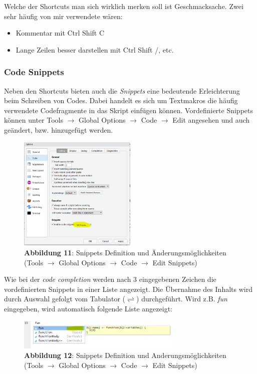 \documentclass[]{article}
\providecommand{\tightlist}{%
  \setlength{\itemsep}{0pt}\setlength{\parskip}{0pt}}
\begin{document}
Welche der Shortcuts man sich wirklich merken soll ist Geschmacksache.
Zwei sehr häufig von mir verwendete wären:

\begin{itemize}
\tightlist
\item
  Kommentar mit Ctrl Shift C
\item
  Lange Zeilen besser darstellen mit Ctrl Shift /, etc.
\end{itemize}

\subsubsection*{Code Snippets}\label{code-snippets}

Neben den Shortcuts bieten auch die \emph{Snippets} eine bedeutende
Erleichterung beim Schreiben von Codes. Dabei handelt es sich um
Textmakros die häufig verwendete Codefragmente in das Skript einfügen
können. Vordefinierte Snippets können unter Tools \(\rightarrow\) Global
Options \(\rightarrow\) Code \(\rightarrow\) Edit angesehen und auch
geändert, bzw. hinzugefügt werden.

\begin{figure}
\centering
\includegraphics[width=0.50000\textwidth]{Images/03_RSnippets.PNG}
\caption{\textbf{Abbildung 11}: Snippets Definition und
Änderungsmöglichkeiten (Tools \(\rightarrow\) Global Options
\(\rightarrow\) Code \(\rightarrow\) Edit Snippets)}
\end{figure}

Wie bei der \emph{code completion} werden nach 3 eingegebenen Zeichen
die vordefinierten Snippets in einer Liste angezeigt. Die Übernahme des
Inhalts wird durch Auswahl gefolgt vom Tabulator
(\(\rightleftharpoons\)) durchgeführt. Wird z.B. \emph{fun} eingegeben,
wird automatisch folgende Liste angezeigt:

\begin{figure}
\centering
\includegraphics[width=0.70000\textwidth]{Images/03_RSnippets_Bsp.PNG}
\caption{\textbf{Abbildung 12}: Snippets Definition und
Anderungsmöglichkeiten (Tools \(\rightarrow\) Global Options
\(\rightarrow\) Code \(\rightarrow\) Edit Snippets)}
\end{figure}
\end{document}

